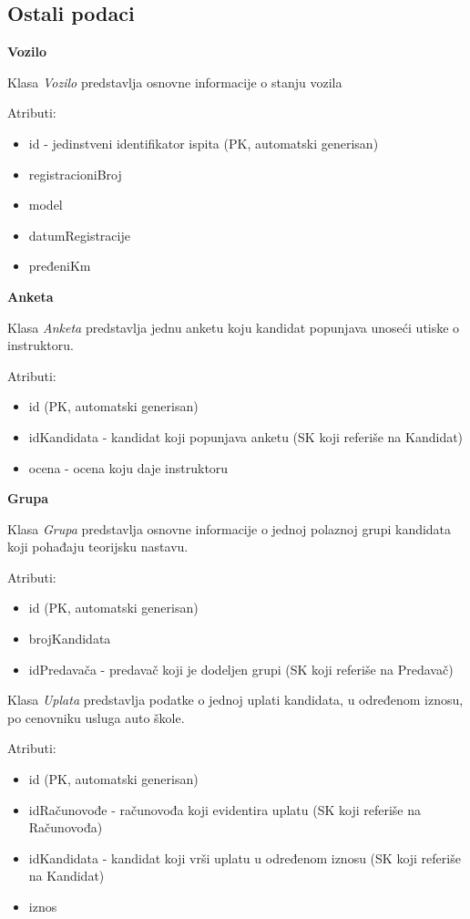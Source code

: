 \subsection{Ostali podaci}

\textbf{\large Vozilo}
\vspace{0.3cm}

Klasa \textit{Vozilo} predstavlja osnovne informacije o stanju vozila

Atributi:
\begin{itemize}
    \item id - jedinstveni identifikator ispita (PK, automatski generisan)
    \item registracioniBroj
    \item model
    \item datumRegistracije
    \item pređeniKm
\end{itemize}

\textbf{\large Anketa}
\vspace{0.3cm}

Klasa \textit{Anketa} predstavlja jednu anketu koju kandidat popunjava unoseći utiske o instruktoru.

Atributi:
\begin{itemize}
    \item id (PK, automatski generisan)
    \item idKandidata - kandidat koji popunjava anketu (SK koji referiše na Kandidat)
    \item ocena - ocena koju daje instruktoru
\end{itemize}

\textbf{\large Grupa}
\vspace{0.3cm}

Klasa \textit{Grupa} predstavlja osnovne informacije o jednoj polaznoj grupi kandidata koji pohađaju teorijsku nastavu.

Atributi:
\begin{itemize}
    \item id (PK, automatski generisan)
    \item brojKandidata 
    \item idPredavača - predavač koji je dodeljen grupi (SK koji referiše na Predavač)
\end{itemize}

Klasa \textit{Uplata} predstavlja podatke o jednoj uplati kandidata, u određenom iznosu, po cenovniku usluga auto škole.

Atributi:
\begin{itemize}
    \item id (PK, automatski generisan)
    \item idRačunovođe - računovođa koji evidentira uplatu (SK koji referiše na Računovođa)
    \item idKandidata - kandidat koji vrši uplatu u određenom iznosu (SK koji referiše na Kandidat)
    \item iznos
    
\end{itemize}


